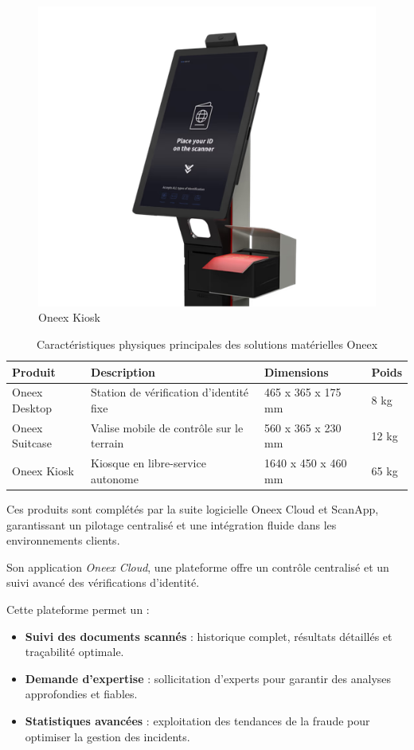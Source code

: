\begin{itemize}
	      \begin{figure} [H]
		      \centering
		      \includegraphics[width=.5\textwidth]{figures/Oneex kiosk.png}
		      \caption{Oneex Kiosk}
	      \end{figure}
\end{itemize}

\begin{table}[H]
	\centering
	\renewcommand{\arraystretch}{1.2}
	\begin{tabular}{|p{3cm}|p{5cm}|p{4cm}|p{2.5cm}|}
		\hline
		\textbf{Produit} & \textbf{Description}                     & \textbf{Dimensions} & \textbf{Poids} \\ \hline
		Oneex Desktop    & Station de vérification d’identité fixe  & 465 x 365 x 175 mm  & 8 kg           \\ \hline
		Oneex Suitcase   & Valise mobile de contrôle sur le terrain & 560 x 365 x 230 mm  & 12 kg          \\ \hline
		Oneex Kiosk      & Kiosque en libre-service autonome        & 1640 x 450 x 460 mm & 65 kg          \\ \hline
	\end{tabular}
	\caption{Caractéristiques physiques principales des solutions matérielles Oneex}
\end{table}
Ces produits sont complétés par la suite logicielle Oneex Cloud et ScanApp, garantissant un pilotage centralisé et une intégration fluide dans les environnements clients.

Son application \emph{Oneex Cloud}, une plateforme offre un contrôle centralisé et un suivi avancé des vérifications d’identité.

Cette plateforme permet un :

\begin{itemize}
	\item \textbf{Suivi des documents scannés} : historique complet, résultats détaillés et traçabilité optimale.
	\item \textbf{Demande d’expertise} : sollicitation d’experts pour garantir des analyses approfondies et fiables.
	\item \textbf{Statistiques avancées} : exploitation des tendances de la fraude pour optimiser la gestion des incidents.
\end{itemize}

